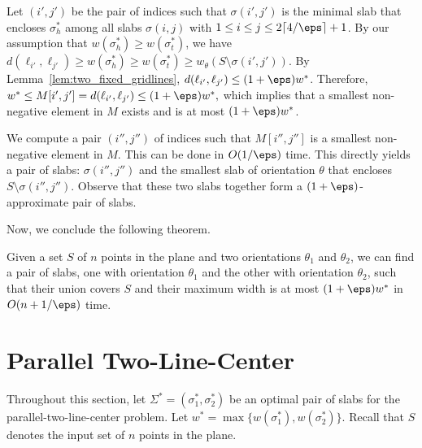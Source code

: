 Let $(i', j')$ be the pair of indices such that $\sigma(i', j')$ is the minimal slab that encloses $\sigma_h^*$ among all slabs $\sigma(i,j)$ with 
$1 \le i \le j \le 2\lceil 4/\eps \rceil + 1$.
By our assumption that $w(\sigma_h^*) \ge w(\sigma_t^*)$, we have 
$d(\ell_{i'}, \ell_{j'}) \ge w(\sigma_h^*) \ge w(\sigma_t^*)  \ge w_\theta(S \setminus \sigma(i', j'))$. 
By Lemma~\ref{lem:two_fixed_gridlines}, 
$d(\ell_{i'}, \ell_{j'}) \le (1+\eps)w^*$. 
Therefore,
$w^* \le M[i', j'] = d(\ell_{i'}, \ell_{j'}) \le (1+\eps)w^*,$
which implies that a smallest non-negative element in $M$ exists and is at most $(1+\eps)w^*$.

We compute a pair $(i'', j'')$ of indices such that $M[i'', j'']$ is a smallest non-negative element in $M$. This can be done in $O(1/\eps)$ time.
This directly yields a pair of slabs: $\sigma(i'', j'')$ and the smallest slab of orientation $\theta$ that encloses $S \setminus \sigma(i'', j'')$.  
Observe that these two slabs together form a $(1+\eps)$-approximate pair of slabs.

Now, we conclude the following theorem.

\begin{theorem}
    \label{thm:two_fixed_apx}
    Given a set $S$ of $n$ points in the plane and two orientations $\theta_1$ and $\theta_2$, 
    we can find a pair of slabs, one with orientation $\theta_1$ and the other with orientation $\theta_2$, such that their union covers $S$ and their maximum width is at most $(1+\eps)w^*$ in $O(n + 1/\eps)$ time.
\end{theorem}


\section{Parallel Two-Line-Center}
\label{sec:parallel}



Throughout this section, let $\Sigma^* = (\sigma_1^*, \sigma_2^* )$ be an optimal pair of slabs for the parallel-two-line-center problem.
Let $w^* = \max \{w(\sigma_1^*), w(\sigma_2^*) \}$.
Recall that $S$ denotes the input set of $n$ points in the plane. 

